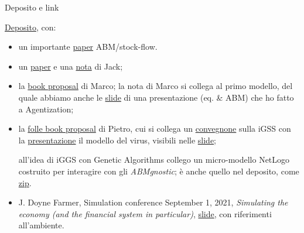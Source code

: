 \documentclass[]{beamer}
\begin{document}
\begin{frame}{Deposito e link}

\href{https://terna.to.it/ejmmp/deposito/}{Deposito}, con:

\begin{itemize}

\item
un importante \href{https://terna.to.it/ejmmp/deposito/stockFlow.pdf}{paper} ABM/stock-flow.

\item
un \href{https://terna.to.it/ejmmp/deposito/JackIonHayek'sEconomics.pdf}{paper} e una \href{https://terna.to.it/ejmmp/deposito/JackIIonHayek-NoteOnAtomicInvestmentProcesses.pdf}{nota} di Jack;

\item
la \href{https://terna.to.it/ejmmp/deposito/MarcoBookProposalTheoreticalModelBookProposal.pdf}{book proposal} di Marco; la nota di Marco si collega al primo modello, del quale abbiamo anche le \href{https://terna.to.it/oligopolyAgentization.pdf}{slide} di una presentazione (eq. \& ABM) che ho fatto a Agentization;

\item
la \href{https://terna.to.it/ejmmp/deposito/PietroBookProposal.pdf}{folle book proposal} di Pietro, cui si collega un \href{https://www.igss-workshop.org}{convegnone} sulla iGSS con la \href{https://www.youtube.com/watch?v=X7DLFvOhqVo}{presentazione} il modello del virus, visibili nelle \href{https://static1.squarespace.com/static/5e0a8466674f5b6963a2e949/t/60bff462ace45c3d0b9f04cf/1623192677563/terna-slides.pdf}{slide};

all'idea di iGGS con Genetic Algorithms collego un micro-modello NetLogo costruito per interagire con gli \emph{ABMgnostic}; è anche quello nel deposito, come \href{https://terna.to.it/ejmmp/deposito/theRace.zip}{zip}.

\item
J. Doyne Farmer, Simulation conference September 1, 2021, \emph{Simulating the economy
(and the financial system in particular)}, \href{https://www.suomenpankki.fi/globalassets/en/financial-stability/payment-and-settelement-system-simulator/events/2021_01_farmer.pdf}{slide}, con riferimenti all'ambiente.


\end{itemize}

\end{frame}
\end{document}
